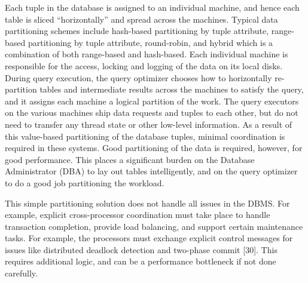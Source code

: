 \documentclass[a4paper,11pt,twoside,openright]{book}
\begin{document}
Each tuple in the database is assigned to an individual machine, and
hence each table is sliced ``horizontally'' and spread across the
machines. Typical data partitioning schemes include hash-based
partitioning by tuple attribute, range-based partitioning by tuple
attribute, round-robin, and hybrid which is a combination of both
range-based and hash-based. Each individual machine is responsible for
the access, locking and logging of the data on its local disks. During
query execution, the query optimizer chooses how to horizontally
re-partition tables and intermediate results across the machines to
satisfy the query, and it assigns each machine a logical partition of
the work. The query executors on the various machines ship data requests
and tuples to each other, but do not need to transfer any thread state
or other low-level information. As a result of this value-based
partitioning of the database tuples, minimal coordination is required in
these systems. Good partitioning of the data is required, however, for
good performance. This places a significant burden on the Database
Administrator (DBA) to lay out tables intelligently, and on the query
optimizer to do a good job partitioning the workload.

This simple partitioning solution does not handle all issues in the
DBMS. For example, explicit cross-processor coordination must take place
to handle transaction completion, provide load balancing, and support
certain maintenance tasks. For example, the processors must exchange
explicit control messages for issues like distributed deadlock detection
and two-phase commit {[}30{]}. This requires additional logic, and can
be a performance bottleneck if not done carefully.
\end{document}
